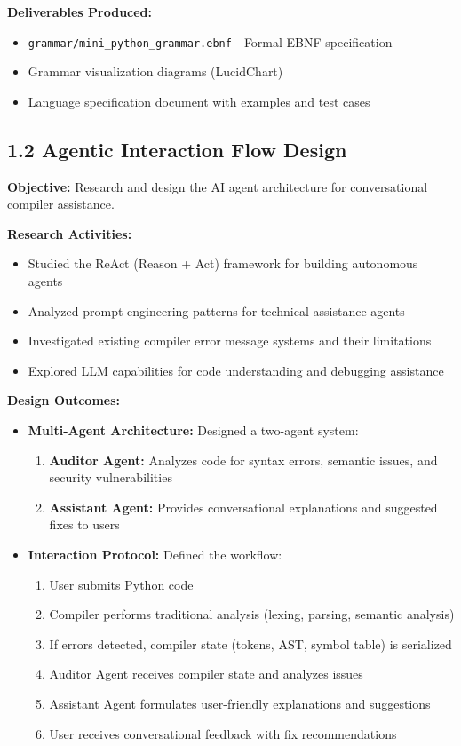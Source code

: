 \documentclass[a4paper,11pt]{article}
\begin{document}
\textbf{Deliverables Produced:}
\begin{itemize}[leftmargin=*]
    \item \texttt{grammar/mini\_python\_grammar.ebnf} - Formal EBNF specification
    \item Grammar visualization diagrams (LucidChart)
    \item Language specification document with examples and test cases
\end{itemize}

\subsection{1.2 Agentic Interaction Flow Design}

\textbf{Objective:} Research and design the AI agent architecture for conversational compiler assistance.

\textbf{Research Activities:}
\begin{itemize}[leftmargin=*]
    \item Studied the ReAct (Reason + Act) framework for building autonomous agents
    \item Analyzed prompt engineering patterns for technical assistance agents
    \item Investigated existing compiler error message systems and their limitations
    \item Explored LLM capabilities for code understanding and debugging assistance
\end{itemize}

\textbf{Design Outcomes:}
\begin{itemize}[leftmargin=*]
    \item \textbf{Multi-Agent Architecture:} Designed a two-agent system:
    \begin{enumerate}
        \item \textbf{Auditor Agent:} Analyzes code for syntax errors, semantic issues, and security vulnerabilities
        \item \textbf{Assistant Agent:} Provides conversational explanations and suggested fixes to users
    \end{enumerate}
    \item \textbf{Interaction Protocol:} Defined the workflow:
    \begin{enumerate}
        \item User submits Python code
        \item Compiler performs traditional analysis (lexing, parsing, semantic analysis)
        \item If errors detected, compiler state (tokens, AST, symbol table) is serialized
        \item Auditor Agent receives compiler state and analyzes issues
        \item Assistant Agent formulates user-friendly explanations and suggestions
        \item User receives conversational feedback with fix recommendations
    \end{enumerate}
\end{itemize}
\end{document}
